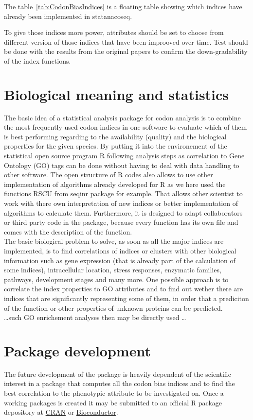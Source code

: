 The table~\ref{tab:CodonBiasIndices} is a floating table showing which indices have already been implemented in statanacoseq.

To give those indices more power, attributes should be set to choose from different version of those indices that have been improoved over time. Test should be done with the results from the original papers to confirm the down-gradability of the index functions.


\section{Biological meaning and statistics}
The basic idea of a statistical analysis package for codon analysis is to combine the most frequently used codon indices in one software to evaluate which of them is best performing regarding to the availability (quality) and the biological properties for the given species. By putting it into the environement of the statistical open source program R following analysis steps as correlation to Gene Ontology (GO) tags can be done without having to deal with data handling to other software. The open structure of R codes also allows to use other implementation of algorithms already developed for R as we here used the functions RSCU from seqinr package for example. That allows other scientist to work with there own interpretation of new indices or better implementation of algorithms to calculate them. Furthermore, it is designed to adapt collaborators or third party code in the package, because every function has its own file and comes with the description of the function.\\
The basic biological problem to solve, as soon as all the major indices are implemented, is to find correlations of indices or clusters with other biological information such as gene expression (that is already part of the calculation of some indices), intracellular location, stress responses, enzymatic families, pathways, development stages and many more. One possible approach is to correlate the index properties to GO attributes and to find out wether there are indices that are significantly representing some of them, in order that a prediciton of the function or other properties of unknown proteins can be predicted.\\

\dots such GO enrichement analyses then may be directly used \dots \\

\section{Package development}
The future development of the package is heavily dependent of the scientific interest in a package that computes all the codon bias indices and to find the best correlation to the phenotypic attribute to be investigated on. 
Once a working packages is created it may be submitted to an official R package depository at \href{https://cran.r-project.org/doc/manuals/r-release/R-exts.html}{CRAN} or \href{https://www.bioconductor.org/developers/how-to/buildingPackagesForBioc/}{Bioconductor}.

